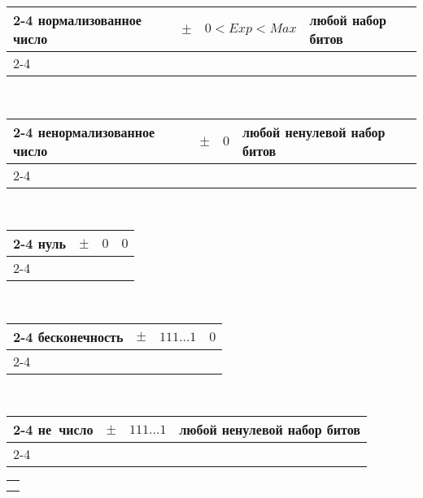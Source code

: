 \bigskip\hangindent=0.3cm\noindent
{\newcommand{\numrow}[3]{%
\begin{tabular}{@{}p{5.2cm}|@{}p{3mm}@{}|p{3cm}|p{7.5cm}|}
  \cline{2-4}
  \hfill #1\rule{0pt}{12pt} & \footnotesize $\pm$ & \hfill #2 & \hfill #3 \\
  \cline{2-4}
\end{tabular}}%
\numrow{  нормализованное число}{\(0 < Exp < Max\)}{          любой набор битов}\\[2pt]
\numrow{ненормализованное число}{            \(0\)}{любой ненулевой набор битов}\\[2pt]
\numrow{                   нуль}{            \(0\)}{                      \(0\)}\\[2pt]
\numrow{          бесконечность}{   \(111\ldots1\)}{                        \(0\)}\\[2pt]
\numrow{               не~число}{   \(111\ldots1\)}{любой ненулевой набор битов}
}



\WhatToReadSection
\begin{tabular}{@{}l@{}}
  \citeauthor[глава~1 стр.~24--50; глава~5 стр.~639--652]{Harris:2015:ru} \\
  \citeauthor[приложения А и Б стр.~708--728]{Tanenbaum:2013:ru}
\end{tabular}



